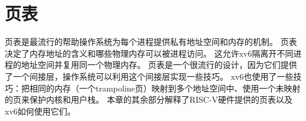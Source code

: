 \chapter{页表}\label{ch03}

页表是最流行的帮助操作系统为每个进程提供私有地址空间和内存的机制。
页表决定了内存地址的含义和哪些物理内存可以被进程访问。
这允许xv6隔离开不同进程的地址空间并复用同一个物理内存。
页表是一个很流行的设计，因为它们提供了一个间接层，操作系统可以利用这个间接层实现一些技巧。
xv6也使用了一些技巧：把相同的内存（一个trampoline页）映射到多个地址空间中、使用一个未映射的页来保护内核和用户栈。
本章的其余部分解释了RISC-V硬件提供的页表以及xv6如何使用它们。
